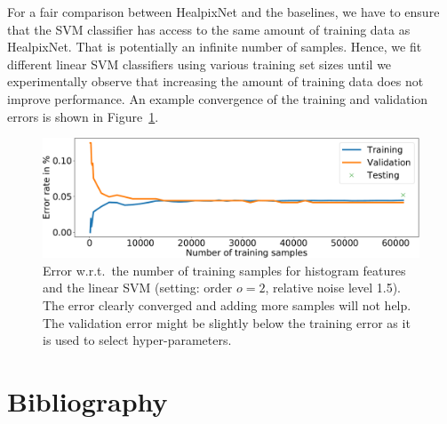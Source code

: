 \documentclass[final,twocolumn,3p,times,sort&compress]{elsarticle}
\newcommand{\figref}[1]{Figure~\ref{fig:#1}}
\newcommand{\1}{\b{1}}              %
\newcommand{\0}{\b{0}}              %
\begin{document}
For a fair comparison between HealpixNet and the baselines, we have to ensure that the SVM classifier has access to the same amount of training data as HealpixNet. That is potentially an infinite number of samples. Hence, we fit different linear SVM classifiers using various training set sizes until we experimentally observe that increasing the amount of training data does not improve performance. An example convergence of the training and validation errors is shown in \figref{hist_error_evolution}.


\begin{figure}
	\centering
	\includegraphics[width=\linewidth]{hist_error_order2_noise1_5}
	\caption{Error w.r.t.\ the number of training samples for histogram features and the linear SVM (setting: order $o=2$, relative noise level 1.5). The error clearly converged and adding more samples will not help. The validation error might be slightly below the training error as it is used to select hyper-parameters.}
	\label{fig:hist_error_evolution}
\end{figure}

\section*{Bibliography}
% 


\end{document}
